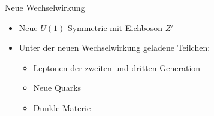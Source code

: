 \begin{frame}{Neue Wechselwirkung}
\begin{itemize}
	\setlength\itemsep{1em}
	\item Neue $U(1)$-Symmetrie mit Eichboson $Z'$ \cite{InColour}
	\item Unter der neuen Wechselwirkung geladene Teilchen:
	\begin{itemize}
		\item Leptonen der zweiten und dritten Generation
		\item Neue Quarks
		\item Dunkle Materie \cite{Z}
	\end{itemize}
\end{itemize}
\end{frame}



